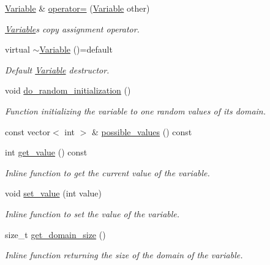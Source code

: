 \begin{DoxyCompactItemize}
\hyperlink{classghost_1_1Variable}{Variable} \& \hyperlink{classghost_1_1Variable_ad82b892892c3531cc3d54d6b5d048bf6}{operator=} (\hyperlink{classghost_1_1Variable}{Variable} other)
\begin{DoxyCompactList}\small\item\em \hyperlink{classghost_1_1Variable}{Variable}\textquotesingle{}s copy assignment operator. \end{DoxyCompactList}\item 
virtual \hyperlink{classghost_1_1Variable_a718686ab389bd31ae0f3cbb312c9be77}{$\sim$\+Variable} ()=default
\begin{DoxyCompactList}\small\item\em Default \hyperlink{classghost_1_1Variable}{Variable} destructor. \end{DoxyCompactList}\item 
void \hyperlink{classghost_1_1Variable_a37018e24ee21e12649599409d7ac3640}{do\+\_\+random\+\_\+initialization} ()
\begin{DoxyCompactList}\small\item\em Function initializing the variable to one random values of its domain. \end{DoxyCompactList}\item 
const vector$<$ int $>$ \& \hyperlink{classghost_1_1Variable_a82380b5d0d4f679401c0139d5d30ad60}{possible\+\_\+values} () const 
\item 
int \hyperlink{classghost_1_1Variable_a7bdebf8b2a369f337690ac38ece31793}{get\+\_\+value} () const 
\begin{DoxyCompactList}\small\item\em Inline function to get the current value of the variable. \end{DoxyCompactList}\item 
void \hyperlink{classghost_1_1Variable_a06f6c296986a017e1713961b4d763b0c}{set\+\_\+value} (int value)
\begin{DoxyCompactList}\small\item\em Inline function to set the value of the variable. \end{DoxyCompactList}\item 
size\+\_\+t \hyperlink{classghost_1_1Variable_afd4a3fe7e7a6d1438c4e90c72b77eee7}{get\+\_\+domain\+\_\+size} ()
\begin{DoxyCompactList}\small\item\em Inline function returning the size of the domain of the variable. \end{DoxyCompactList}\item 

\end{DoxyCompactItemize}
